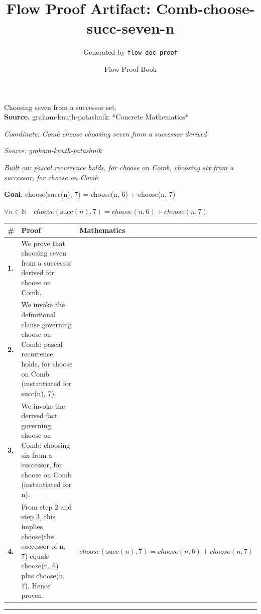 \documentclass[11pt]{article}
\title{Flow Proof Artifact: Comb-choose-succ-seven-n}
\author{Generated by \texttt{flow doc proof}}
\date{Flow Proof Book}
\theoremstyle{definition}
\begin{document}
\maketitle
Choosing seven from a successor set.\\[0.5em]
\textbf{Source.} graham-knuth-patashnik: *Concrete Mathematics*\\[0.5em]
\bigskip
{}\par
\smallskip\noindent\textit{Coordinate: Comb \cdot choose \cdot choosing seven from a successor derived}\par
\smallskip\noindent\textit{Source: graham-knuth-patashnik}\par
\smallskip\noindent\textit{Built on: pascal recurrence holds, for choose on Comb, choosing six from a successor, for choose on Comb}\par
\medskip
\noindent\textbf{Goal.} choose(succ(n), 7) = choose(n, 6) + choose(n, 7)\par
\noindent$\displaystyle \forall n \in \mathbb{N}\quad choose(\mathrm{succ}(n), 7) = choose(n, 6) + choose(n, 7)$\par
\medskip
\noindent
\begin{tabular}{@{} >{\raggedright\arraybackslash}p{} >{\raggedright\arraybackslash}p{} >{\raggedleft\arraybackslash}p{} @{}}
\textbf{\#} & \textbf{Proof} & \textbf{Mathematics} \\
\midrule
\textbf{1.} & We prove that choosing seven from a successor derived for choose on Comb. & \\[0.45em]
\textbf{2.} & We invoke the definitional clause governing choose on Comb: pascal recurrence holds, for choose on Comb (instantiated for succ(n), 7). & \\[0.45em]
\textbf{3.} & We invoke the derived fact governing choose on Comb: choosing six from a successor, for choose on Comb (instantiated for n). & \\[0.45em]
\textbf{4.} & From step 2 and step 3, this implies choose(the successor of n, 7) equals choose(n, 6) plus choose(n, 7). Hence proven. & $\displaystyle choose(\mathrm{succ}(n), 7) = choose(n, 6) + choose(n, 7)$ \\[0.45em]
\bottomrule
\end{tabular}
\label{thm:Comb-choose-choosing_seven_from_a_successor_derived}
\par\medskip\hrule
\end{document}

